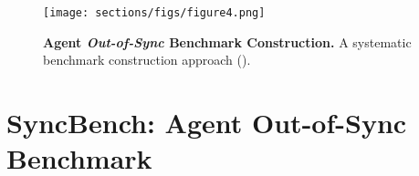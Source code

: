 






\begin{figure*}[!t]
\begin{center}
\begin{small}
    \vspace{-0em}    %
    \centering
    \texttt{[image: sections/figs/figure4.png]}
    \vspace{-1.8em}  %
    \caption{\textbf{Agent \textit{Out-of-Sync} Benchmark Construction.} A systematic benchmark construction approach ().}
    \label{fig:figure 4}
    \vspace{-1.5em}
\end{small}
\end{center}
\end{figure*}














\section{SyncBench: Agent Out-of-Sync Benchmark}
\label{Section: Benchmark}





